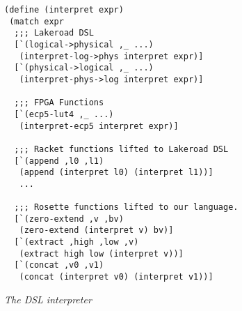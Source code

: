
\begin{figure}
\begin{lstlisting}
(define (interpret expr)
 (match expr
  ;;; Lakeroad DSL
  [`(logical->physical ,_ ...)
   (interpret-log->phys interpret expr)]
  [`(physical->logical ,_ ...)
   (interpret-phys->log interpret expr)]
  
  ;;; FPGA Functions
  [`(ecp5-lut4 ,_ ...)
   (interpret-ecp5 interpret expr)]
 
  ;;; Racket functions lifted to Lakeroad DSL
  [`(append ,l0 ,l1)
   (append (interpret l0) (interpret l1))]
   ... 
   
  ;;; Rosette functions lifted to our language.
  [`(zero-extend ,v ,bv)
   (zero-extend (interpret v) bv)]
  [`(extract ,high ,low ,v)
   (extract high low (interpret v))]
  [`(concat ,v0 ,v1)
   (concat (interpret v0) (interpret v1))]
\end{lstlisting}
\caption{{\em The \lr DSL interpreter}}
\label{fig:lakeroad-dsl-interpreter}
\end{figure}
